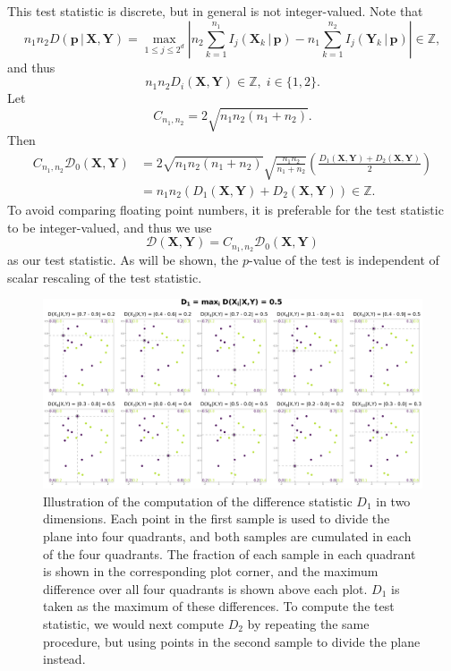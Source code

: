This test statistic is discrete, but in general is not integer-valued. Note that
\begin{equation*}
n_{1}n_{2}D(\mathbf{p}\,\rvert\,\mathbf{X},\mathbf{Y})=\max_{1\leq j\leq 2^{d}}\left|n_{2}\sum_{k=1}^{n_{1}}I_{j}\left(\mathbf{X}_{k}\,\rvert\,\mathbf{p}\right)-n_{1}\sum_{k=1}^{n_{2}}I_{j}\left(\mathbf{Y}_{k}\,\rvert\,\mathbf{p}\right)\right|\in\mathbb{Z},
\end{equation*}
and thus
\begin{equation*}
n_{1}n_{2}D_{i}(\mathbf{X},\mathbf{Y})\in\mathbb{Z},\;i\in\{1,2\}.
\end{equation*}
Let
\begin{equation*}
C_{n_{1},n_{2}}=2\sqrt{n_{1}n_{2}(n_{1}+n_{2})}.
\end{equation*}
Then
\begin{align*}
C_{n_{1},n_{2}}\mathcal{D}_{0}(\mathbf{X},\mathbf{Y})&=2\sqrt{n_{1}n_{2}(n_{1}+n_{2})}\sqrt{\frac{n_{1}n_{2}}{n_{1}+n_{2}}}\left(\frac{D_{1}(\mathbf{X},\mathbf{Y})+D_{2}(\mathbf{X},\mathbf{Y})}{2}\right)\\&=n_{1}n_{2}(D_{1}(\mathbf{X},\mathbf{Y})+D_{2}(\mathbf{X},\mathbf{Y}))\in\mathbb{Z}.
\end{align*}
To avoid comparing floating point numbers, it is preferable for the test statistic to be integer-valued, and thus we use
\begin{equation}
\label{eq:test_stat}
\mathcal{D}(\mathbf{X},\mathbf{Y})=C_{n_{1},n_{2}}\mathcal{D}_{0}(\mathbf{X},\mathbf{Y})
\end{equation}
as our test statistic. As will be shown, the $p$-value of the test is independent of scalar rescaling of the test statistic.

\begin{figure}[htbp]
\centering
\includegraphics[scale=0.248]{figures/fig1.png}
\caption{Illustration of the computation of the difference statistic $D_{1}$ in two dimensions. Each point in the first sample is used to divide the plane into four quadrants, and both samples are cumulated in each of the four quadrants. The fraction of each sample in each quadrant is shown in the corresponding plot corner, and the maximum difference over all four quadrants is shown above each plot. $D_{1}$ is taken as the maximum of these differences. To compute the test statistic, we would next compute $D_{2}$ by repeating the same procedure, but using points in the second sample to divide the plane instead.}
\label{figure:example_stat}
\end{figure}

